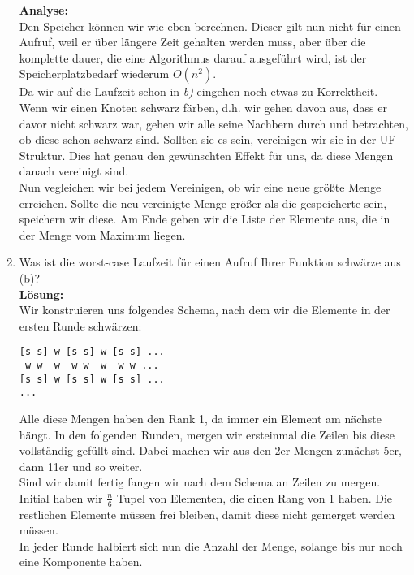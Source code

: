 \documentclass[11pt,a4paper,ngerman]{article}
\begin{document}
\begin{enumerate}[\bfseries (a)]
\textbf{Analyse:}\\
Den Speicher können wir wie eben berechnen. Dieser gilt nun nicht für einen Aufruf, weil er über längere Zeit gehalten werden muss, aber über die komplette dauer, die eine Algorithmus darauf ausgeführt wird, ist der Speicherplatzbedarf wiederum $O(n^2)$.\\

Da wir auf die Laufzeit schon in \emph{b)} eingehen noch etwas zu Korrektheit.\\

Wenn wir einen Knoten schwarz färben, d.h. wir gehen davon aus, dass er davor nicht schwarz war, gehen wir alle seine Nachbern durch und betrachten, ob diese schon schwarz sind. Sollten sie es sein, vereinigen wir sie in der UF-Struktur. Dies hat genau den gewünschten Effekt für uns, da diese Mengen danach vereinigt sind.\\
Nun vegleichen wir bei jedem Vereinigen, ob wir eine neue größte Menge erreichen. Sollte die neu vereinigte Menge größer als die gespeicherte sein, speichern wir diese. Am Ende geben wir die Liste der Elemente aus, die in der Menge vom Maximum liegen.

\item Was ist die worst-case Laufzeit für einen Aufruf Ihrer Funktion schwärze aus (b)?\\

\textbf{Lösung:}\\

Wir konstruieren uns folgendes Schema, nach dem wir die Elemente in der ersten Runde schwärzen:\\
\begin{lstlisting}
[s s] w [s s] w [s s] ...
 w w  w  w w  w  w w ...
[s s] w [s s] w [s s] ...
... 
\end{lstlisting}
Alle diese Mengen haben den Rank 1, da immer ein Element am nächste hängt. In den folgenden Runden, mergen wir ersteinmal die Zeilen bis diese vollständig gefüllt sind. Dabei machen wir aus den 2er Mengen zunächst 5er, dann 11er und so weiter.\\
Sind wir damit fertig fangen wir nach dem Schema an Zeilen zu mergen.\\

Initial haben wir $\frac{n}{6}$ Tupel von Elementen, die einen Rang von 1 haben. Die restlichen Elemente müssen frei bleiben, damit diese nicht gemerget werden müssen.\\
In jeder Runde halbiert sich nun die Anzahl der Menge, solange bis nur noch eine Komponente haben.\\


\end{enumerate}
\end{document}
